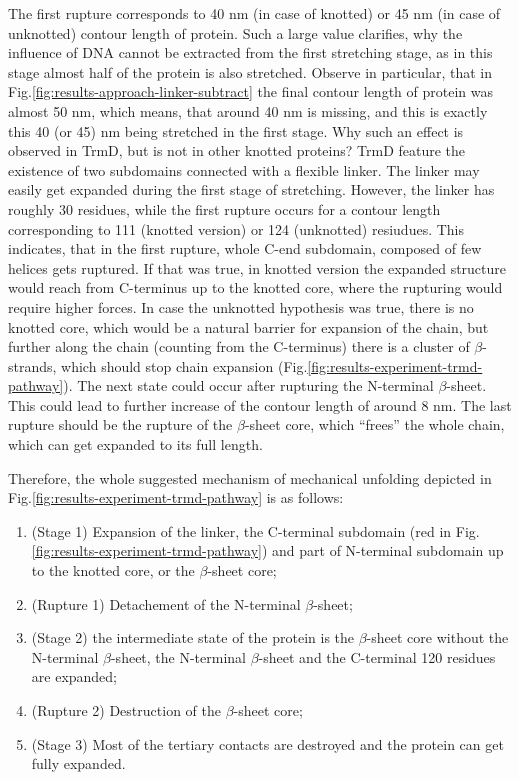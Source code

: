 The first rupture corresponds to 40 nm (in case of knotted) or 45 nm (in case of unknotted) contour length of protein.
Such a large value clarifies, why the influence of DNA cannot be extracted from the first stretching stage, as in this stage almost half of the protein is also stretched.
Observe in particular, that in Fig.\ref{fig:results-approach-linker-subtract} the final contour length of protein was almost 50 nm, which means, that around 40 nm is missing, and this is exactly this 40 (or 45) nm being stretched in the first stage.
Why such an effect is observed in TrmD, but is not in other knotted proteins?
TrmD feature the existence of two subdomains connected with a flexible linker.
The linker may easily get expanded during the first stage of stretching.
However, the linker has roughly 30 residues, while the first rupture occurs for a contour length corresponding to 111 (knotted version) or 124 (unknotted) resiudues.
This indicates, that in the first rupture, whole C-end subdomain, composed of few helices gets ruptured.
If that was true, in knotted version the expanded structure would reach from C-terminus up to the knotted core, where the rupturing would require higher forces.
In case the unknotted hypothesis was true, there is no knotted core, which would be a natural barrier for expansion of the chain, but further along the chain (counting from the C-terminus) there is a cluster of $\beta$-strands, which should stop chain expansion (Fig.\ref{fig:results-experiment-trmd-pathway}).
The next state could occur after rupturing the N-terminal $\beta$-sheet.
This could lead to further increase of the contour length of around 8 nm.
The last rupture should be the rupture of the $\beta$-sheet core, which ``frees'' the whole chain, which can get expanded to its full length.

Therefore, the whole suggested mechanism of mechanical unfolding depicted in Fig.\ref{fig:results-experiment-trmd-pathway} is as follows:
\begin{enumerate}
    \item (Stage 1) Expansion of the linker, the C-terminal subdomain (red in Fig.\ref{fig:results-experiment-trmd-pathway}) and part of N-terminal subdomain up to the knotted core, or the $\beta$-sheet core;
    \item (Rupture 1) Detachement of the N-terminal $\beta$-sheet;
    \item (Stage 2) the intermediate state of the protein is the $\beta$-sheet core without the N-terminal $\beta$-sheet, the N-terminal $\beta$-sheet and the C-terminal 120 residues are expanded;
    \item (Rupture 2) Destruction of the $\beta$-sheet core;
    \item (Stage 3) Most of the tertiary contacts are destroyed and the protein can get fully expanded.
\end{enumerate}

